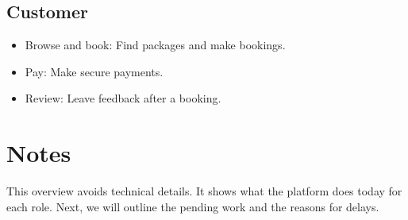 \subsection*{Customer}
\begin{itemize}
  \item Browse and book: Find packages and make bookings.
  \item Pay: Make secure payments.
  \item Review: Leave feedback after a booking.
\end{itemize}

\section{Notes}
This overview avoids technical details. It shows what the platform does today for each role. Next, we will outline the pending work and the reasons for delays.


